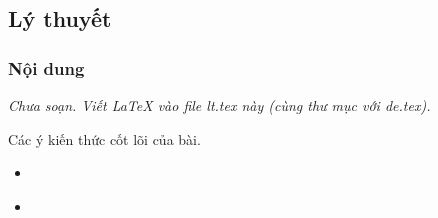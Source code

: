 

\subsection{Lý thuyết}
\subsubsection{Nội dung}
\textit{Chưa soạn. Viết LaTeX vào file lt.tex này (cùng thư mục với de.tex).}
\begin{kienthuc}
Các ý kiến thức cốt lõi của bài.
\end{kienthuc}
\begin{emdahoc}
\begin{itemize}\item \end{itemize}
\end{emdahoc}
\begin{emcothe}
\begin{itemize}\item \end{itemize}
\end{emcothe}
